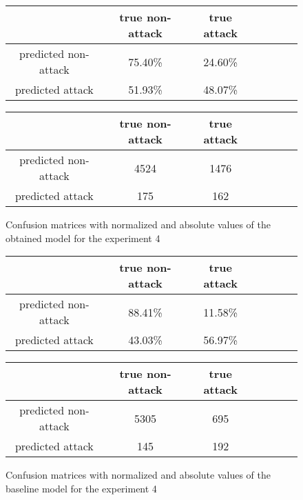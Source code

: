 \documentclass{article}
\begin{document}
\begin{figure}[h!]
    \centering
    \begin{tabular}{ |c|c|c|c|c|c|c| }
     \hline
      & true non-attack & true attack \\
     \hline
     predicted non-attack & 75.40\% & 24.60\% \\
     \hline
     predicted attack & 51.93\% & 48.07\% \\
     \hline
    \end{tabular}

    \vspace{0.2cm}

    \centering
    \begin{tabular}{ |c|c|c|c|c|c|c| }
     \hline
      & true non-attack & true attack \\
     \hline
     predicted non-attack & 4524 & 1476 \\
     \hline
     predicted attack & 175 & 162 \\
     \hline
    \end{tabular}
    \caption{Confusion matrices with normalized and absolute values of the obtained model for the experiment 4}
    \label{fig-exp4-transcriptions}
\end{figure}


\begin{figure}[h!]
    \centering
    \begin{tabular}{ |c|c|c|c|c|c|c| }
     \hline
      & true non-attack & true attack \\
     \hline
     predicted non-attack & 88.41\% & 11.58\% \\
     \hline
     predicted attack & 43.03\% & 56.97\% \\
     \hline
    \end{tabular}

    \vspace{0.2cm}

    \centering
    \begin{tabular}{ |c|c|c|c|c|c|c| }
     \hline
      & true non-attack & true attack \\
     \hline
     predicted non-attack & 5305 & 695 \\
     \hline
     predicted attack & 145 & 192 \\
     \hline
    \end{tabular}
    \caption{Confusion matrices with normalized and absolute values of the baseline model for the experiment 4}
    \label{fig-exp4-baseline}
\end{figure}
\end{document}
